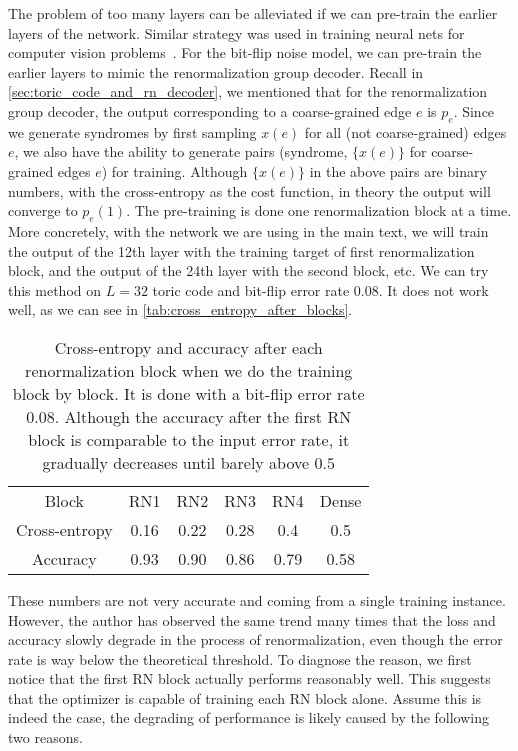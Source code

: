 The problem of too many layers can be alleviated if we can pre-train the earlier layers of the network.
Similar strategy was used in training neural nets for computer vision problems~\cite{erhan2010does}.
For the bit-flip noise model, we can pre-train the earlier layers to mimic the renormalization group decoder.
Recall in \autoref{sec:toric_code_and_rn_decoder}, we mentioned that for the renormalization group decoder, the output corresponding to a coarse-grained edge $e$ is $p_e$.
Since we generate syndromes by first sampling $x(e)$ for all (not coarse-grained) edges $e$, we also have the ability to generate pairs (syndrome, $\{x(e)\}$ for coarse-grained edges $e$) for training.
Although $\{x(e)\}$ in the above pairs are binary numbers, with the cross-entropy as the cost function, in theory the output will converge to $p_e(1)$.
The pre-training is done one renormalization block at a time.
More concretely, with the network we are using in the main text, we will train the output of the 12th layer with the training target of first renormalization block, and the output of the 24th layer with the second block, etc.
We can try this method on $L=32$ toric code and bit-flip error rate $0.08$.
It does not work well, as we can see in \autoref{tab:cross_entropy_after_blocks}.
\begin{table}
	\begin{tabular}{c c c c c c}
		Block & RN1 & RN2 & RN3 & RN4 & Dense\\
		Cross-entropy  & 0.16 & 0.22 & 0.28 & 0.4 & 0.5 \\
		Accuracy & 0.93 & 0.90 & 0.86 & 0.79 & 0.58
	\end{tabular}
	\caption{Cross-entropy and accuracy after each renormalization block when we do the training block by block.
		It is done with a bit-flip error rate $0.08$.
		Although the accuracy after the first RN block is comparable to the input error rate, it gradually decreases until barely above $0.5$}
	\label{tab:cross_entropy_after_blocks}
\end{table}
These numbers are not very accurate and coming from a single training instance.
However, the author has observed the same trend many times that the loss and accuracy slowly degrade in the process of renormalization, even though the error rate is way below the theoretical threshold.
To diagnose the reason, we first notice that the first RN block actually performs reasonably well.
This suggests that the optimizer is capable of training each RN block alone.
Assume this is indeed the case, the degrading of performance is likely caused by the following two reasons.

